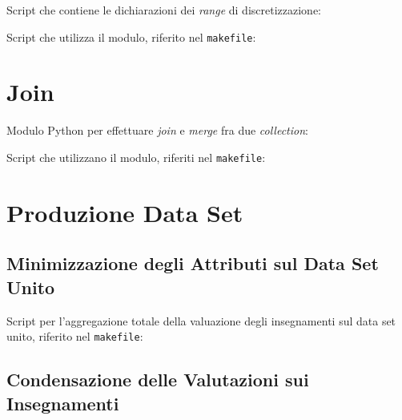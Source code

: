 \begin{appendices}
        \vspace{0.8 cm}

        Script che contiene le dichiarazioni dei \textit{range} di discretizzazione:
        

        \vspace{0.8 cm}

        Script che utilizza il modulo, riferito nel \texttt{makefile}: \\
        

    \section{Join}
    \label{appendix:merge}
        Modulo Python per effettuare \textit{join} e \textit{merge} fra due \textit{collection}: \\
        

        \vspace{0.8 cm}

        Script che utilizzano il modulo, riferiti nel \texttt{makefile}: \\
        
        

    \section{Produzione Data Set}
   
        \subsection{Minimizzazione degli Attributi sul Data Set Unito}
        \label{appendix:min}

            Script per l'aggregazione totale della valuazione degli insegnamenti sul data set unito, riferito nel \texttt{makefile}: \\
            

        \subsection{Condensazione delle Valutazioni sui Insegnamenti}
        \label{appendix:eval}


\end{appendices}
